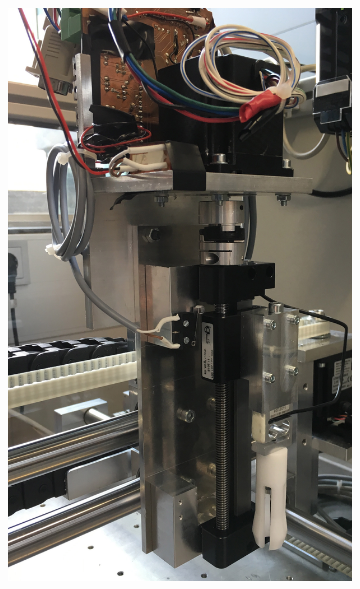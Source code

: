 \documentclass[a4paper,12pt]{scrreprt}
\begin{document}
  \begin{figure} [H]
        \centering
        \begin{subfigure}[b]{0.45\textwidth}
                \centering
                \includegraphics[width=1\textwidth]{pictures/Seitl_1}
        \end{subfigure}%
        ~ %
        \begin{subfigure}[b]{0.45\textwidth}

\end{subfigure}
\end{figure}
\end{document}
